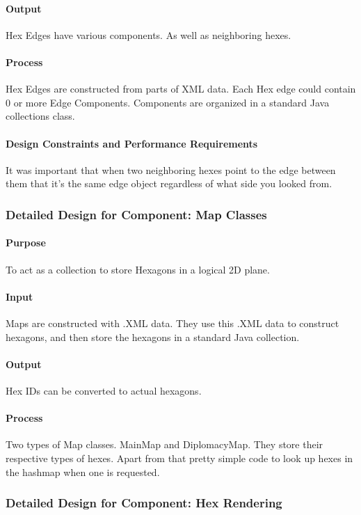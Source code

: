 \documentclass[12pt,a4paper,titlepage]{article}
\begin{document}
\paragraph{Output}
Hex Edges have various components. As well as neighboring hexes.
\paragraph{Process}
Hex Edges are constructed from parts of XML data.
Each Hex edge could contain 0 or more Edge Components.
Components are organized in a standard Java collections class.
\paragraph{Design Constraints and Performance Requirements}
It was important that when two neighboring hexes point to the edge between them
that it's the same edge object regardless of what side you looked from.

\subsubsection{Detailed Design for Component: Map Classes}
\paragraph{Purpose} To act as a collection to store Hexagons in a logical 2D plane.
\paragraph{Input}
Maps are constructed with .XML data. They use this .XML data to construct
hexagons, and then store the hexagons in a standard Java collection.
\paragraph{Output}
Hex IDs can be converted to actual hexagons.
\paragraph{Process}
Two types of Map classes. MainMap and DiplomacyMap. They store their respective
types of hexes. Apart from that pretty simple code to look up hexes in the hashmap
when one is requested.

\subsubsection{Detailed Design for Component: Hex Rendering}
\end{document}
